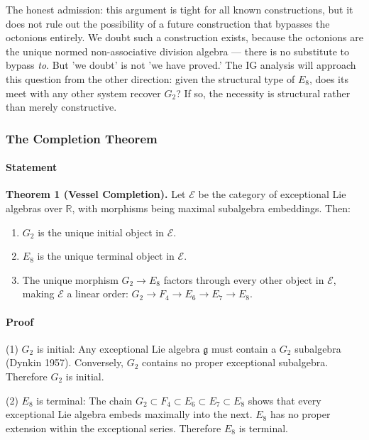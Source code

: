 \documentclass[12pt,a4paper]{article}
\begin{document}
The honest admission: this argument is tight for all known constructions, but it does not rule out the possibility of a future construction that bypasses the octonions entirely. We doubt such a construction exists, because the octonions are the unique normed non-associative division algebra --- there is no substitute to bypass \emph{to}. But 'we doubt' is not 'we have proved.' The IG analysis will approach this question from the other direction: given the structural type of $E_8$, does its meet with any other system recover $G_2$? If so, the necessity is structural rather than merely constructive.

\subsubsection{The Completion Theorem}

\paragraph{Statement}

\textbf{Theorem 1 (Vessel Completion).} Let $\mathcal{E}$ be the category of exceptional Lie algebras over $\mathbb{R}$, with morphisms being maximal subalgebra embeddings. Then:

\begin{enumerate}
    \item $G_2$ is the unique initial object in $\mathcal{E}$.
    \item $E_8$ is the unique terminal object in $\mathcal{E}$.
    \item The unique morphism $G_2 \to E_8$ factors through every other object in $\mathcal{E}$, making $\mathcal{E}$ a linear order: $G_2 \to F_4 \to E_6 \to E_7 \to E_8$.
\end{enumerate}

\paragraph{Proof}

(1) $G_2$ is initial: Any exceptional Lie algebra $\mathfrak{g}$ must contain a $G_2$ subalgebra (Dynkin 1957). Conversely, $G_2$ contains no proper exceptional subalgebra. Therefore $G_2$ is initial.

(2) $E_8$ is terminal: The chain $G_2 \subset F_4 \subset E_6 \subset E_7 \subset E_8$ shows that every exceptional Lie algebra embeds maximally into the next. $E_8$ has no proper extension within the exceptional series. Therefore $E_8$ is terminal.
\end{document}
